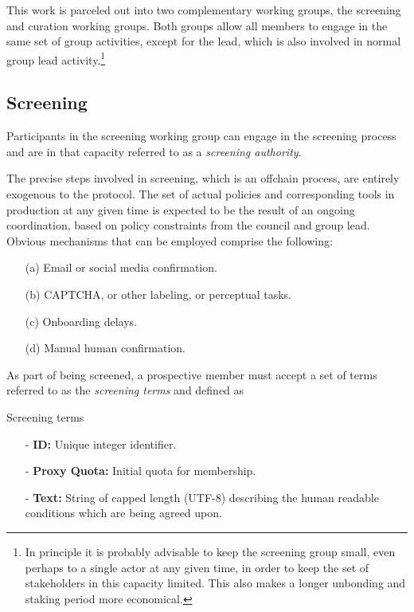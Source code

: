 \documentclass{article}
\newenvironment{concept_box}[1]
    {
    \begin{tcolorbox}
    {\large \textbf{#1} }
    }
    {
    \end{tcolorbox}
    }
\begin{document}
This work is parceled out into two complementary working groups, the screening and curation working groups. Both groups allow all members to engage in the same set of group activities, except for the lead, which is also involved in normal group lead activity.\footnote{In principle it is probably advisable to keep the screening group small, even perhaps to a single actor at any given time, in order to keep the set of stakeholders in this capacity limited. This also makes a longer unbonding and staking period more economical.}

\subsection{Screening}

Participants in the screening working group can engage in the screening process and are in that capacity referred to as a \textit{screening authority}.

The precise steps involved in screening, which is an offchain process, are entirely exogenous to the protocol. The set of actual policies and corresponding tools in production at any given time is expected to be the result of an ongoing coordination, based on policy constraints from the council and group lead. Obvious mechanisms that can be employed comprise the following:

\begin{enumerate}
  \item[(a)] Email or social media confirmation.
  \item[(b)] CAPTCHA, or other labeling, or perceptual tasks.
  \item[(c)] Onboarding delays.
  \item[(d)] Manual human confirmation.
\end{enumerate}

As part of being screened, a prospective member must accept a set of terms referred to as the \textit{screening terms} and defined as\\

\begin{concept_box}{Screening terms}
    \begin{itemize}
      \item[-] \textbf{ID:} Unique integer identifier.
      \item[-] \textbf{Proxy Quota:} Initial quota for membership.
      \item[-] \textbf{Text:} String of capped length (UTF-8) describing the human readable conditions which are being agreed upon.
    \end{itemize}
\end{concept_box}
\end{document}
